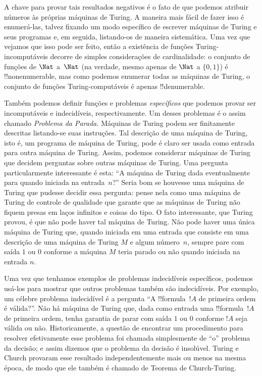 \documentclass[../../../include/open-logic-section]{subfiles}
\begin{document}
A chave para provar tais resultados negativos é o fato de que podemos
atribuir números às próprias máquinas de Turing. A maneira mais fácil
de fazer isso é enumerá-las, talvez fixando um modo específico de
escrever máquinas de Turing e seus programas e, em seguida,
listando-os de maneira sistemática. Uma vez que vejamos que isso pode
ser feito, então a existência de funções Turing-incomputáveis decorre
de simples considerações de cardinalidade: o conjunto de funções de
$\Nat$ a~$\Nat$ (na verdade, mesmo apenas de $\Nat$ a $\{0, 1\}$) é
!!{nonenumerable}, mas como podemos enumerar todas as máquinas de
Turing, o conjunto de funções Turing-computáveis é apenas
!!{denumerable}.

Também podemos definir funções e problemas \emph{específicos} que
podemos provar ser incomputáveis e indecidíveis, respectivamente. Um
desses problemas é o assim chamado \emph{Problema da Parada.} Máquinas
de Turing podem ser finitamente descritas listando-se suas instruções.
Tal descrição de uma máquina de Turing, isto é, um programa de máquina
de Turing, pode é claro ser usada como entrada para outra máquina de
Turing. Assim, podemos considerar máquinas de Turing que decidem
perguntas sobre outras máquinas de Turing. Uma pergunta
particularmente interessante é esta: ``A máquina de Turing dada
eventualmente para quando iniciada na entrada~$n$?'' Seria bom se
houvesse uma máquina de Turing que pudesse decidir essa pergunta:
pense nela como uma máquina de Turing de controle de qualidade que
garante que as máquinas de Turing não fiquem presas em laços infinitos
e coisas do tipo. O fato interessante, que Turing provou, é que não
pode haver tal máquina de Turing. Não pode haver uma única máquina de
Turing que, quando iniciada em uma entrada que consiste em uma
descrição de uma máquina de Turing $M$ e algum número~$n$, sempre pare
com saída $1$ ou $0$ conforme a máquina $M$ teria parado ou não quando
iniciada na entrada $n$.

Uma vez que tenhamos exemplos de problemas indecidíveis específicos,
podemos usá-los para mostrar que outros problemas também são
indecidíveis. Por exemplo, um célebre problema indecidível é a
pergunta ``A !!{formula}~$!A$ de primeira ordem é válida?''. Não há
máquina de Turing que, dada como entrada uma !!{formula}~$!A$ de
primeira ordem, tenha garantia de parar com saída $1$ ou $0$ conforme
$!A$ seja válida ou não. Historicamente, a questão de encontrar um
procedimento para resolver efetivamente esse problema foi chamada
simplesmente de ``o'' problema da decisão; e assim dizemos que o
problema da decisão é insolúvel. Turing e Church provaram esse
resultado independentemente mais ou menos na mesma época, de modo que
ele também é chamado de Teorema de Church-Turing.
\end{document}
